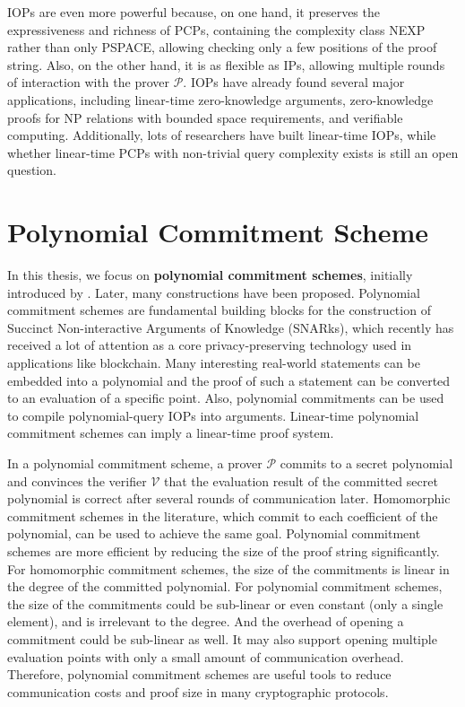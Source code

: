 IOPs are even more powerful because, on one hand, it preserves the expressiveness and richness of PCPs, containing the complexity class NEXP rather than only PSPACE, allowing checking only a few positions of the proof string. Also, on the other hand, it is as flexible as IPs, allowing multiple rounds of interaction with the prover $\mathcal{P}$. IOPs have already found several major applications, including linear-time zero-knowledge arguments, zero-knowledge proofs for NP relations with bounded space requirements, and verifiable computing.
Additionally, lots of researchers have built linear-time IOPs, while whether linear-time PCPs with non-trivial query complexity exists is still an open question.


\section{Polynomial Commitment Scheme}

In this thesis, we focus on \textbf{polynomial commitment schemes}, 
initially introduced by \cite{DBLP:conf/asiacrypt/KateZG10}.
Later, many constructions 
\cite{DBLP:conf/sp/TomescuCZAPGD20} 
\cite{DBLP:journals/iacr/YurekLFKM21} 
\cite{277222}
have been proposed.
Polynomial commitment schemes are fundamental building blocks for the construction of Succinct Non-interactive Arguments of Knowledge (SNARks), 
which recently has received a lot of attention as a core privacy-preserving technology used in applications like blockchain. Many interesting real-world statements can be embedded into a polynomial and the proof of such a statement can be converted to an evaluation of a specific point. Also, polynomial commitments can be used to compile polynomial-query IOPs into arguments. Linear-time polynomial commitment schemes can imply a linear-time proof system.

In a polynomial commitment scheme, a prover $\mathcal{P}$ commits to a secret polynomial and convinces the verifier $\mathcal{V}$ that the evaluation result of the committed secret polynomial is correct after several rounds of communication later. Homomorphic commitment schemes in the literature, which commit to each coefficient of the polynomial, can be used to achieve the same goal. Polynomial commitment schemes are more efficient by reducing the size of the proof string significantly. For homomorphic commitment schemes, the size of the commitments is linear in the degree of the committed polynomial. For polynomial commitment schemes, the size of the commitments could be sub-linear or even constant (only a single element), and is irrelevant to the degree. And the overhead of opening a commitment could be sub-linear as well. It may also support opening multiple evaluation points with only a small amount of communication overhead. Therefore, polynomial commitment schemes are useful tools to reduce communication costs and proof size in many cryptographic protocols.


